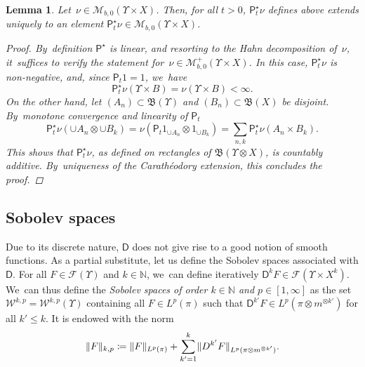 \documentclass[JEP,XML,SOM,Unicode,published]{cedram}
\newtheorem{lemma}[theorem]{Lemma}
\theoremstyle{definition}
\theoremstyle{remark}
\DeclarePairedDelimiter{\norm}{\lVert}{\rVert}
\begin{document}
\begin{lemma}\label{l:countableAdditivity}
Let~$\nu\in \mathscr{M}_{b,0}(\varUpsilon \times X)$.
Then, for all $t > 0$, $\mathsf{P}^{\star}_{t} \nu$ defines above extends uniquely to an element $\mathsf{P}^{\star}_t\nu \in \mathscr{M}_{b,0}(\varUpsilon \times X)$.

\begin{proof}
By~definition $\mathsf{P}^{\star}$ is linear, and resorting to the Hahn decomposition of~$\nu$, it~suffices to verify the statement for~$\nu\in \mathscr{M}_{b,0}^+(\varUpsilon \times X)$.
In this case, $\mathsf{P}_{t}^{\star} \nu$ is non-negative, and, since $\mathsf{P}_{t}1 =1$, we~have
\begin{equation*}
\mathsf{P}_{t}^{\star}\nu(\varUpsilon \times B) = \nu(\varUpsilon \times B) < \infty.
\end{equation*}
On the other hand, let $(A_{n}) \subset \mathfrak{B}(\varUpsilon)$ and $(B_{n}) \subset \mathfrak{B}(X)$ be disjoint.
By~monotone convergence and linearity of $\mathsf{P}_{t}$
\begin{equation*}
\mathsf{P}_{t}^{\star}\nu(\cup A_{n} \otimes \cup B_{k}) = \nu(\mathsf{P}_{t} 1_{\cup A_{n}} \otimes 1_{\cup B_{k}}) = \sum_{n,k} \mathsf{P}_{t}^{\star}\nu(A_{n} \times B_{k}).
\end{equation*}
This shows that $\mathsf{P}_{t}^{\star}\nu$, as defined on rectangles of $\mathfrak{B}(\varUpsilon \otimes X)$, is countably additive.
By~uniqueness of the Carathéodory extension, this concludes the proof.
\end{proof}
\end{lemma}

\subsection{Sobolev spaces}

Due to its discrete nature, $\mathsf{D}$ does not give rise to a good notion of smooth functions.
As a partial substitute, let us define the Sobolev spaces associated with $\mathsf{D}$.
For all $F \in \mathscr{F}(\varUpsilon)$ and $k \in \mathbb{N}$, we~can define iteratively $\mathsf{D}^{k} F \in \mathscr{F}(\varUpsilon \times X^{k})$. We~can thus define the \emph{Sobolev spaces of order $k \in \mathbb{N}$ and $p \in [1,\infty]$} as the set $\mathscr{W}^{k,p} = \mathscr{W}^{k,p}(\varUpsilon)$ containing all $F \in L^{p}(\pi)$ such that $\mathsf{D}^{k'} F \in L^{p}(\pi \otimes m^{\otimes k'})$ for all $k' \leq k$.
It is endowed with the norm
\begin{equation*}
\norm{F}_{k,p} \coloneq \norm{F}_{L^{p}(\pi)} + \sum_{k'=1}^{k} \norm{D^{k'}F}_{L^{p}(\pi \otimes m^{\otimes k'})}.
\end{equation*}
\end{document}
